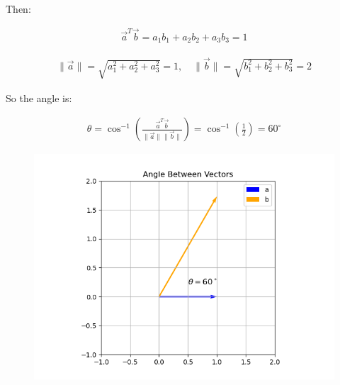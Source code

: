 \documentclass{article}
\begin{document}
Then:


\begin{align}
\vec{a}^T \vec{b} = a_1b_1 + a_2b_2 + a_3b_3 = 1
\end{align}




\begin{align}
\|\vec{a}\| = \sqrt{a_1^2 + a_2^2 + a_3^2} = 1, \quad
\|\vec{b}\| = \sqrt{b_1^2 + b_2^2 + b_3^2} = 2
\end{align}



So the angle is:


\begin{align}
\theta = \cos^{-1}\left(\frac{\vec{a}^T \vec{b}}{\|\vec{a}\| \|\vec{b}\|}\right)
= \cos^{-1}\left(\frac{1}{2}\right) = 60^\circ
\end{align}

\begin{figure}[H]
    \centering
    \includegraphics[width=0.7\linewidth]{figs/Figure_1.png}
    \caption{}
    \label{fig:fig1}
\end{figure}
\end{document}
